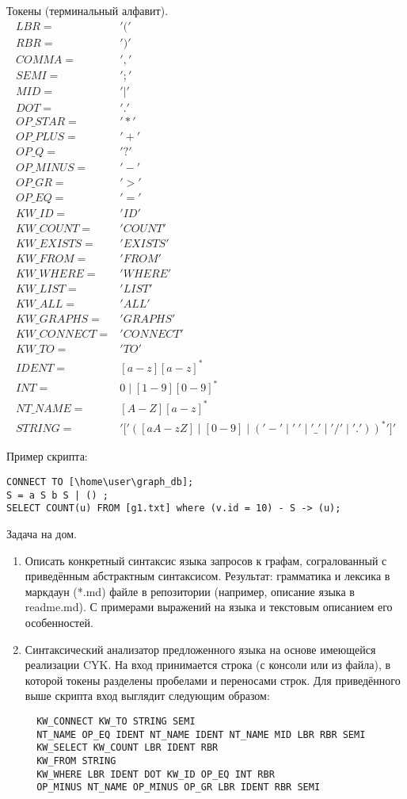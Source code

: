 Токены (терминальный алфавит).
\begin{align*}
LBR = & '(' \\
RBR = & ')' \\
COMMA = & ',' \\
SEMI = & ';' \\
MID = & '|' \\
DOT = & '.' \\
OP\_STAR = & '*' \\ 
OP\_PLUS = & '+' \\
OP\_Q = & '?' \\
OP\_MINUS = & '-' \\
OP\_GR = & '>' \\
OP\_EQ = & '=' \\
KW\_ID = & 'ID' \\
KW\_COUNT = & 'COUNT' \\
KW\_EXISTS = & 'EXISTS' \\
KW\_FROM = & 'FROM' \\
KW\_WHERE = & 'WHERE' \\
KW\_LIST = & 'LIST' \\
KW\_ALL = & 'ALL' \\
KW\_GRAPHS = & 'GRAPHS' \\
KW\_CONNECT = & 'CONNECT' \\
KW\_TO = & 'TO' \\
IDENT = & [a-z][a-z]^* \\
INT = & 0 \mid [1-9][0-9]^* \\
NT\_NAME = & [A-Z][a-z]^* \\
STRING = & {'['} ([aA-zZ] \mid [0-9] \mid ({'-'} \mid {' \ '} \mid {'\_'} \mid {'/'} \mid {'.'}))^* {']'}
\end{align*}

Пример скрипта:
\begin{verbatim}
CONNECT TO [\home\user\graph_db];
S = a S b S | () ;
SELECT COUNT(u) FROM [g1.txt] where (v.id = 10) - S -> (u);
\end{verbatim}

Задача на дом.
\begin{enumerate}
  \item Описать конкретный синтаксис языка запросов к графам, согралованный с приведённым абстрактным синтаксисом. Результат: грамматика и лексика в маркдаун (*.md) файле в репозитории (например, описание языка в readme.md). С примерами выражений на языка и текстовым описанием его особенностей.
  \item Синтаксический анализатор предложенного языка на основе имеющейся реализации CYK. На вход принимается строка (с консоли или из файла), в которой токены разделены пробелами и переносами строк. Для приведённого выше скрипта вход выглядит следующим образом:
  \begin{verbatim}
  KW_CONNECT KW_TO STRING SEMI 
  NT_NAME OP_EQ IDENT NT_NAME IDENT NT_NAME MID LBR RBR SEMI 
  KW_SELECT KW_COUNT LBR IDENT RBR 
  KW_FROM STRING 
  KW_WHERE LBR IDENT DOT KW_ID OP_EQ INT RBR 
  OP_MINUS NT_NAME OP_MINUS OP_GR LBR IDENT RBR SEMI
  \end{verbatim}
\end{enumerate}